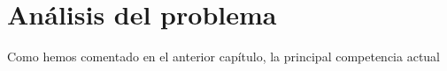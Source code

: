 \chapter{Análisis del problema}
 


Como hemos comentado en el anterior capítulo, la principal competencia actual 